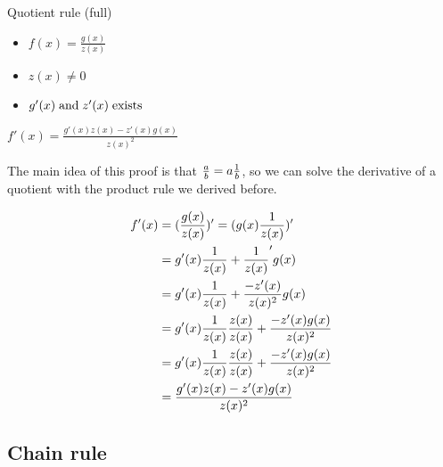 \begin{property}{Quotient rule (full)}
\begin{precondition}
    \begin{itemize}
      \item $f(x)=\frac{g(x)}{z(x)}$
      \item $z(x) \neq 0$
      \item $ g'(x) \; \text{and} \; z'(x) \; \text{exists} \;$
    \end{itemize}
  \end{precondition}
\begin{claim}
    $f'(x)= \frac{g'(x) z(x)-z'(x) g(x)}{z(x)^2}$
\end{claim}
\begin{Proof}

The main idea of this proof is that $\frac{a}{b} = a \frac{1}{b}$, so we can solve the derivative of a quotient with the product rule we derived before.

\begin{align*}
f'(x)&= (\frac{g(x)}{z(x)})'= (g(x) \frac{1}{z(x)})'
\\&= g'(x) \frac{1}{z(x)} + \frac{1}{z(x)}' g(x)
\\&= g'(x) \frac{1}{z(x)} +  \frac{-z'(x) }{z(x)^2} g(x)
\\&= g'(x) \frac{1}{z(x)} \frac{z(x)}{z(x)} +  \frac{-z'(x) g(x) }{z(x)^2}
\\&= g'(x) \frac{1}{z(x)} \frac{z(x)}{z(x)} +  \frac{-z'(x) g(x) }{z(x)^2}
\\&= \frac{g'(x) z(x)-z'(x) g(x)}{z(x)^2}
\end{align*}
\end{Proof}
\end{property}


\subsection{Chain rule}

